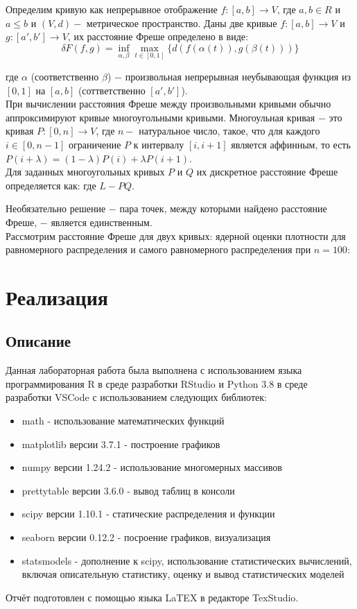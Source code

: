\documentclass[a4paper,14pt]{article}
\begin{document}
	Определим кривую как непрерывное отображение $f: [a,b] \rightarrow V$, где $a, b \in R$ и $a \leq b$ и $(V,d) - $ метрическое пространство.
	Даны две кривые $f: [a,b] \rightarrow V$ и $g: [a',b'] \rightarrow V$, их расстояние Фреше определено в виде:
	\begin{equation}
		\delta F(f,g) = \inf_{\alpha, \beta}\max_{t \in [0,1]}{\{d(f(\alpha(t)), g(\beta(t)))\}}
	\end{equation}
	
	где $\alpha$ (соответственно $\beta$) $-$ произвольная непрерывная неубывающая функция из $[0, 1]$ на $[a, b]$ (соттветственно $[a',b']$). \\
	При вычислении расстояния Фреше между произвольными кривыми обычно аппроксимируют кривые многоугольными кривыми. Многоульная кривая $-$ это кривая $P: [0,n] \rightarrow V$, где $n - $ натуральное число, такое, что для каждого $i \in [0,n-1]$ ограничение $P$ к интервалу $[i,i+1]$ является аффинным, то есть $P(i+\lambda) = (1-\lambda)P(i)+\lambda P(i+1)$. \\
	Для заданных многоугольных кривых $P$ и $Q$ их дискретное расстояние Фреше определяется как:
	где $L - PQ$.
	
	Необязательно решение $ - $ пара точек, между которыми найдено расстояние Фреше, $-$ является единственным. \\
	
	Рассмотрим расстояние Фреше для двух кривых: ядерной оценки плотности для равномерного распределения и самого равномерного распределения при $n=100$:
		\section{Реализация}
	\subsection{Описание}
	Данная лабораторная работа была выполнена с использованием языка
	программирования R в среде разработки RStudio и Python 3.8 в среде разработки VSCode с
	использованием следующих библиотек:
	\begin{itemize}
		\item math - использование математических функций
		\item matplotlib версии 3.7.1 - построение графиков
		\item numpy версии 1.24.2 - использование многомерных массивов
		\item prettytable версии 3.6.0 - вывод таблиц в консоли 
		\item scipy версии 1.10.1 - статические распределения и функции
		\item seaborn версии 0.12.2 - посроение графиков, визуализация
		\item statsmodels - дополнение к scipy, использование статистических вычислений, включая описательную статистику, оценку и вывод статистических моделей
	\end{itemize}
	Отчёт подготовлен с помощью языка LaTEX в редакторе TexStudio.
\end{document}
